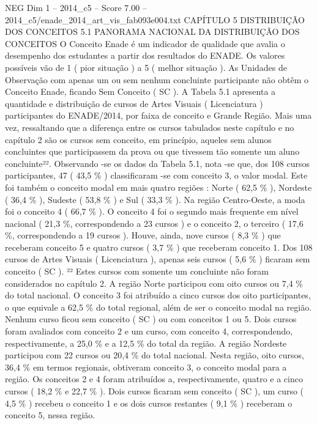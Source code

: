 \begin{textsample}{NEG Dim 1 – 2014\_c5 – Score 7.00 – 2014\_c5/enade\_2014\_art\_vis\_fab093e004.txt}  \label{ex:f1_neg_337}
CAPÍTULO 5 DISTRIBUIÇÃO DOS CONCEITOS 5.1 PANORAMA NACIONAL DA DISTRIBUIÇÃO DOS CONCEITOS O Conceito Enade é um indicador de qualidade que avalia o desempenho dos estudantes a partir dos resultados do ENADE.
Os valores possíveis vão de 1 ( pior situação ) a 5 ( melhor situação ).
As Unidades de Observação com apenas um ou sem nenhum concluinte participante não obtêm o Conceito Enade, ficando Sem Conceito ( SC ).
A Tabela 5.1 apresenta a quantidade e distribuição de cursos de Artes Visuais ( Licenciatura ) participantes do ENADE/2014, por faixa de conceito e Grande Região.
Mais uma vez, ressaltando que a diferença entre os cursos tabulados neste capítulo e no capítulo 2 são os cursos sem conceito, em princípio, aqueles sem alunos concluintes que participassem da prova ou que tivessem tão somente um aluno concluinte²².
Observando -se os dados da Tabela 5.1, nota -se que, dos 108 cursos participantes, 47 ( 43,5 \% ) classificaram -se com conceito 3, o valor modal.
Este foi também o conceito modal em mais quatro regiões : Norte ( 62,5 \% ), Nordeste ( 36,4 \% ), Sudeste ( 53,8 \% ) e Sul ( 33,3 \% ).
Na região Centro-Oeste, a moda foi o conceito 4 ( 66,7 \% ).
O conceito 4 foi o segundo mais frequente em nível nacional ( 21,3 \%, correspondendo a 23 cursos ) e o conceito 2, o terceiro ( 17,6 \%, correspondendo a 19 cursos ).
Houve, ainda, nove cursos ( 8,3 \% ) que receberam conceito 5 e quatro cursos ( 3,7 \% ) que receberam conceito 1.
Dos 108 cursos de Artes Visuais ( Licenciatura ), apenas seis cursos ( 5,6 \% ) ficaram sem conceito ( SC ). ²² Estes cursos com somente um concluinte não foram considerados no capítulo 2.
A região Norte participou com oito cursos ou 7,4 \% do total nacional.
O conceito 3 foi atribuído a cinco cursos dos oito participantes, o que equivale a 62,5 \% do total regional, além de ser o conceito modal na região.
Nenhum curso ficou sem conceito ( SC ) ou com conceitos 1 ou 5.
Dois cursos foram avaliados com conceito 2 e um curso, com conceito 4, correspondendo, respectivamente, a 25,0 \% e a 12,5 \% do total da região.
A região Nordeste participou com 22 cursos ou 20,4 \% do total nacional.
Nesta região, oito cursos, 36,4 \% em termos regionais, obtiveram conceito 3, o conceito modal para a região.
Os conceitos 2 e 4 foram atribuídos a, respectivamente, quatro e a cinco cursos ( 18,2 \% e 22,7 \% ).
Dois cursos ficaram sem conceito ( SC ), um curso ( 4,5 \% ) recebeu o conceito 1 e os dois cursos restantes ( 9,1 \% ) receberam o conceito 5, nessa região.

\end{textsample}
